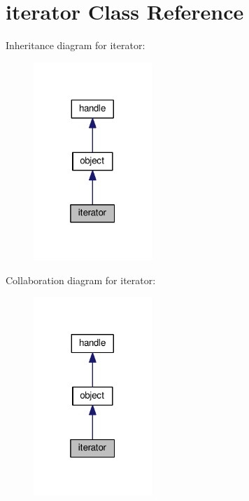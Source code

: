 \hypertarget{classiterator}{}\section{iterator Class Reference}
\label{classiterator}


Inheritance diagram for iterator\+:
\nopagebreak
\begin{figure}[H]
\begin{center}
\leavevmode
\includegraphics[width=127pt]{classiterator__inherit__graph}
\end{center}
\end{figure}


Collaboration diagram for iterator\+:
\nopagebreak
\begin{figure}[H]
\begin{center}
\leavevmode
\includegraphics[width=127pt]{classiterator__coll__graph}
\end{center}
\end{figure}
